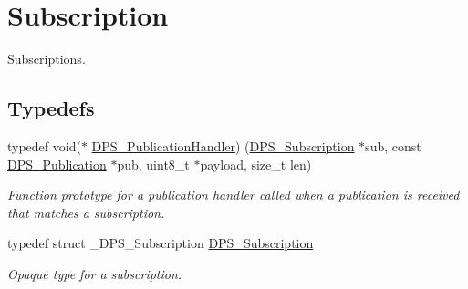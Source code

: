 \hypertarget{group__subscription}{}\section{Subscription}
\label{group__subscription}


Subscriptions.  


\subsection*{Typedefs}
\begin{DoxyCompactItemize}
\item 
typedef void($\ast$ \hyperlink{group__subscription_gab95ef1762636ad505c940744b8dce83f}{D\+P\+S\+\_\+\+Publication\+Handler}) (\hyperlink{group__subscription_gadb927c4c1b7306867a75fc4288b54af7}{D\+P\+S\+\_\+\+Subscription} $\ast$sub, const \hyperlink{group__publication_ga0d439693474aa54e27f3d45a054696ac}{D\+P\+S\+\_\+\+Publication} $\ast$pub, uint8\+\_\+t $\ast$payload, size\+\_\+t len)
\begin{DoxyCompactList}\small\item\em Function prototype for a publication handler called when a publication is received that matches a subscription. \end{DoxyCompactList}\item 
\mbox{\label{group__subscription_gadb927c4c1b7306867a75fc4288b54af7}} 
typedef struct \+\_\+\+D\+P\+S\+\_\+\+Subscription \hyperlink{group__subscription_gadb927c4c1b7306867a75fc4288b54af7}{D\+P\+S\+\_\+\+Subscription}
\begin{DoxyCompactList}\small\item\em Opaque type for a subscription. \end{DoxyCompactList}\end{DoxyCompactItemize}

